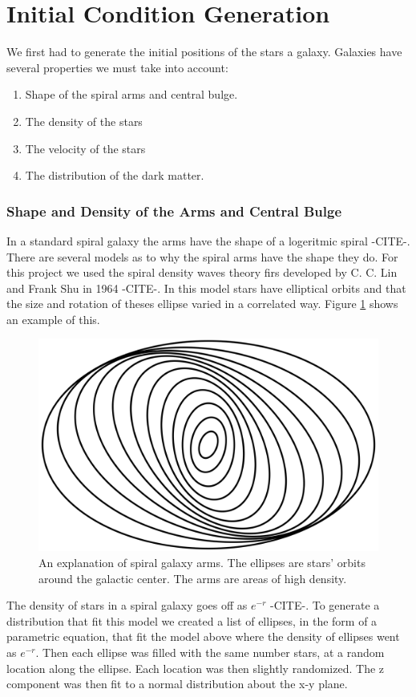\documentclass{report}
\begin{document}
\section{Initial Condition Generation}
We first had to generate the initial positions of the stars a galaxy. Galaxies have several properties we must take into account:
\begin{enumerate}
  \item Shape of the spiral arms and central bulge. 
  \item The density of the stars
  \item The velocity of the stars 
  \item The distribution of the dark matter. 
\end{enumerate}
\subsubsection{Shape and Density of the Arms and Central Bulge}
In a standard spiral galaxy the arms have the shape of a logeritmic spiral -CITE-. There are several models as to why the spiral arms have the shape they do. For this project we used the spiral density waves theory firs developed by C. C. Lin and Frank Shu in 1964 -CITE-. In this model stars have elliptical orbits and that the size and rotation of theses ellipse varied in a correlated way. Figure \ref{fig:spiral-arms} shows an example of this.
\begin{figure}
\centering
\includegraphics[width=.8\columnwidth]{spiral-arms.png}
\caption{An explanation of spiral galaxy arms.  The ellipses are stars' orbits around the galactic center.  The arms are areas of high density. \label{fig:spiral-arms}}
\end{figure}

The density of stars in a spiral galaxy goes off as $e^{-r}$ -CITE-. To generate a distribution that fit this model we created a list of ellipses, in the form of a parametric equation, that fit the model above where the density of ellipses went as $e^{-r}$. Then each ellipse was filled with the same number stars, at a random location along the ellipse. Each location was then slightly randomized. The z component was then fit to a normal distribution about the x-y plane. 
\end{document}
